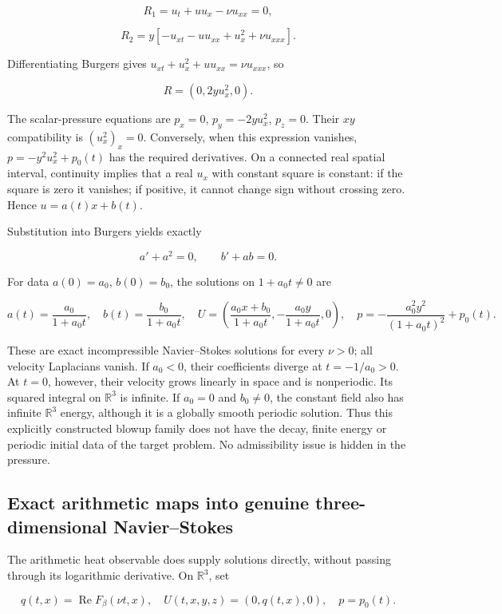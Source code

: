 \[
R_1=u_t+uu_x-\nu u_{xx}=0,
\]

\[
R_2=y[-u_{xt}-uu_{xx}+u_x^2+\nu u_{xxx}].
\]

Differentiating Burgers gives \(u_{xt}+u_x^2+u u_{xx}=\nu u_{xxx}\), so

\[
R=(0,2y u_x^2,0).
\]

The scalar-pressure equations are \(p_x=0\), \(p_y=-2y u_x^2\), \(p_z=0\). Their \(xy\) compatibility is \((u_x^2)_x=0\). Conversely, when this expression vanishes, \(p=-y^2 u_x^2+p_0(t)\) has the required derivatives. On a connected real spatial interval, continuity implies that a real \(u_x\) with constant square is constant: if the square is zero it vanishes; if positive, it cannot change sign without crossing zero. Hence \(u=a(t)x+b(t)\).

Substitution into Burgers yields exactly

\[
a'+a^2=0,\qquad b'+ab=0.
\]

For data \(a(0)=a_0\), \(b(0)=b_0\), the solutions on \(1+a_0t\ne 0\) are

\[
a(t)=\frac{a_0}{1+a_0t},\quad
b(t)=\frac{b_0}{1+a_0t},\quad
U=\left(\frac{a_0x+b_0}{1+a_0t},-\frac{a_0y}{1+a_0t},0\right),
\quad p=-\frac{a_0^2y^2}{(1+a_0t)^2}+p_0(t).
\]

These are exact incompressible Navier--Stokes solutions for every \(\nu>0\); all velocity Laplacians vanish. If \(a_0<0\), their coefficients diverge at \(t=-1/a_0>0\). At \(t=0\), however, their velocity grows linearly in space and is nonperiodic. Its squared integral on \(\mathbb R^3\) is infinite. If \(a_0=0\) and \(b_0\ne 0\), the constant field also has infinite \(\mathbb R^3\) energy, although it is a globally smooth periodic solution. Thus this explicitly constructed blowup family does not have the decay, finite energy or periodic initial data of the target problem. No admissibility issue is hidden in the pressure.

\subsection{Exact arithmetic maps into genuine three-dimensional Navier--Stokes}\label{exact-arithmetic-maps-into-genuine-three-dimensional-navierstokes}

The arithmetic heat observable does supply solutions directly, without passing through its logarithmic derivative. On \(\mathbb R^3\), set

\[
q(t,x)=\operatorname{Re}F_\beta(\nu t,x),\quad
U(t,x,y,z)=(0,q(t,x),0),\quad p=p_0(t).
\]

